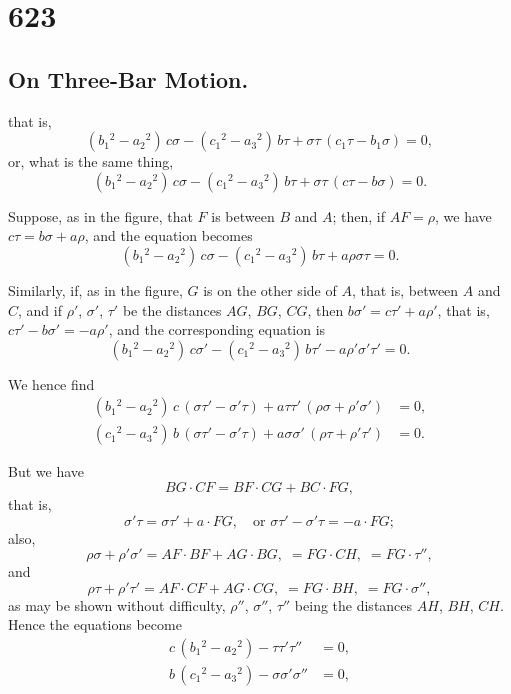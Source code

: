 \documentclass[11pt,a4paper]{book}
\begin{document}
\section*{623}
\subsection*{On Three-Bar Motion.\quad [Continued]}

\setcounter{equation}{0}
\noindent
that is,
\[
(b_1{}^{\!2} - a_2{}^{\!2})\, c\sigma - (c_1{}^{\!2} - a_3{}^{\!2})\, b\tau + \sigma\tau\, (c_1\tau - b_1\sigma) = 0,
\]
or, what is the same thing,
\[
(b_1{}^{\!2} - a_2{}^{\!2})\, c\sigma - (c_1{}^{\!2} - a_3{}^{\!2})\, b\tau + \sigma\tau\, (c\tau - b\sigma) = 0.
\]

Suppose, as in the figure, that $F$ is between $B$ and $A$; then, if $AF = \rho$, we have $c\tau = b\sigma + a\rho$, and the equation becomes
\[
(b_1{}^{\!2} - a_2{}^{\!2})\, c\sigma - (c_1{}^{\!2} - a_3{}^{\!2})\, b\tau + a\rho\sigma\tau = 0.
\]

Similarly, if, as in the figure, $G$ is on the other side of $A$, that is, between $A$ and $C$, and if $\rho'$, $\sigma'$, $\tau'$ be the distances $AG$, $BG$, $CG$, then $b\sigma' = c\tau' + a\rho'$, that is, $c\tau' - b\sigma' = -a\rho'$, and the corresponding equation is
\[
(b_1{}^{\!2} - a_2{}^{\!2})\, c\sigma' - (c_1{}^{\!2} - a_3{}^{\!2})\, b\tau' - a\rho'\sigma'\tau' = 0.
\]

We hence find
\begin{align*}
(b_1{}^{\!2} - a_2{}^{\!2})\, c\, (\sigma\tau' - \sigma'\tau) + a\tau\tau'\, (\rho\sigma + \rho'\sigma') &= 0, \\
(c_1{}^{\!2} - a_3{}^{\!2})\, b\, (\sigma\tau' - \sigma'\tau) + a\sigma\sigma'\, (\rho\tau + \rho'\tau') &= 0.
\end{align*}

But we have
\[
BG \cdot CF = BF \cdot CG + BC \cdot FG,
\]
that is,
\[
\sigma'\tau = \sigma\tau' + a \cdot FG, \quad \text{or } \sigma\tau' - \sigma'\tau = -a \cdot FG;
\]
also,
\[
\rho\sigma + \rho'\sigma' = AF \cdot BF + AG \cdot BG, \;= FG \cdot CH, \;= FG \cdot \tau'',
\]
and
\[
\rho\tau + \rho'\tau' = AF \cdot CF + AG \cdot CG, \;= FG \cdot BH, \;= FG \cdot \sigma'',
\]
as may be shown without difficulty, $\rho''$, $\sigma''$, $\tau''$ being the distances $AH$, $BH$, $CH$.
Hence the equations become
\begin{align*}
c\, (b_1{}^{\!2} - a_2{}^{\!2}) - \tau\tau'\tau'' &= 0, \\
b\, (c_1{}^{\!2} - a_3{}^{\!2}) - \sigma\sigma'\sigma'' &= 0,
\end{align*}
\end{document}
